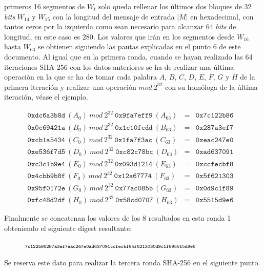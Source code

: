 \documentclass{article}
\begin{document}
        \noindent primeros 16 segmentos de $W_{t}$ solo queda rellenar los últimos dos bloques de 32 \textit{bits} $W_{14}$ y $W_{15}$ con la longitud del mensaje de entrada $|M|$ en hexadecimal, con tantos ceros por la izquierda como sean necesario para alcanzar 64 \textit{bits} de longitud, en este caso es $280$. Los valores que irán en los segmentos desde $W_{16}$ hasta $W_{63}$ se obtienen siguiendo las pautas explicadas en el punto 6 de este documento. Al igual que en la primera ronda, cuando se hayan realizado las 64 iteraciones SHA-256 con los datos anteriores se ha de realizar una última operación en la que se ha de tomar cada palabra $A$, $B$, $C$, $D$, $E$, $F$, $G$ y $H$ de la primera iteración y realizar una operación $mod\ 2^{32}$ con su homóloga de la última iteración, véase el ejemplo.
        
        \begin{figure}[H]
        \centering
            $\begin{array}{lll}
                \texttt{0xdc6a3b8d}\ (A_0)\ mod\ 2^{32}\ \texttt{0x9fa7eff9}\ (A_63) & = & \texttt{0x7c122b86} \\
                \texttt{0x0c69421a}\ (B_0)\ mod\ 2^{32}\ \texttt{0x1c10fcdd}\ (B_63) & = & \texttt{0x287a3ef7} \\
                \texttt{0xcb1a5434}\ (C_0)\ mod\ 2^{32}\ \texttt{0x1fa7f3ac}\ (C_63) & = & \texttt{0xeac247e0} \\
                \texttt{0xe536f7d5}\ (D_0)\ mod\ 2^{32}\ \texttt{0xc82c78bc}\ (D_63) & = & \texttt{0xad637091} \\
                \texttt{0xc3c1b9e4}\ (E_0)\ mod\ 2^{32}\ \texttt{0x093d1214}\ (E_63) & = & \texttt{0xccfecbf8} \\
                \texttt{0x4cbb9b8f}\ (F_0)\ mod\ 2^{32}\ \texttt{0x12a67774}\ (F_63) & = & \texttt{0x5f621303} \\
                \texttt{0x95f0172e}\ (G_0)\ mod\ 2^{32}\ \texttt{0x77ac085b}\ (G_63) & = & \texttt{0x0d9c1f89} \\
                \texttt{0xfc48d2df}\ (H_0)\ mod\ 2^{32}\ \texttt{0x58cd0707}\ (H_63) & = & \texttt{0x5515d9e6}
            \end{array}$
        \end{figure}
        
        Finalmente se concatenan los valores de los 8 resultados en esta ronda 1 obteniendo el siguiente digest resultante:
        
        \begin{figure}[H]
        \centering
            $\scriptsize{\texttt{7c122b86287a3ef7eac247e0ad637091ccfecbf85f6213030d9c1f895515d9e6}}$
        \end{figure}
        Se reserva este dato para realizar la tercera ronda SHA-256 en el siguiente punto.
        
\end{document}
